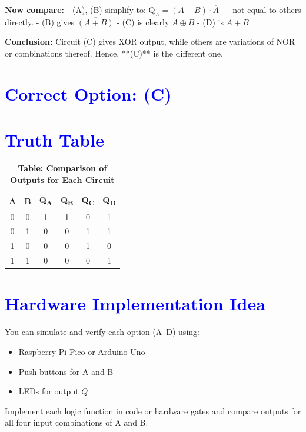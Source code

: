 \documentclass[twocolumn]{article}
\begin{document}
\textbf{Now compare:}  
- (A), (B) simplify to: $\text{Q}_A = \overline{(A + B)} \cdot \overline{A}$ — not equal to others directly.  
- (B) gives $\overline{(A + B)}$  
- (C) is clearly $A \oplus B$  
- (D) is $\overline{A} + B$

\textbf{Conclusion:} Circuit (C) gives XOR output, while others are variations of NOR or combinations thereof.  
Hence, **(C)** is the different one.

\section*{\textcolor{blue}{Correct Option: (C)}}

\section*{\textcolor{blue}{Truth Table}}

\begin{table}[h]
\centering
\renewcommand{\arraystretch}{1.3}
\begin{tabular}{|c|c|c|c|c|c|}
\hline
A & B & Q\textsubscript{A} & Q\textsubscript{B} & Q\textsubscript{C} & Q\textsubscript{D} \\
\hline
0 & 0 & 1 & 1 & 0 & 1 \\
0 & 1 & 0 & 0 & 1 & 1 \\
1 & 0 & 0 & 0 & 1 & 0 \\
1 & 1 & 0 & 0 & 0 & 1 \\
\hline
\end{tabular}
\caption*{\textbf{Table: Comparison of Outputs for Each Circuit}}
\end{table}

\section*{\textcolor{blue}{Hardware Implementation Idea}}

You can simulate and verify each option (A–D) using:
\begin{itemize}
    \item Raspberry Pi Pico or Arduino Uno
    \item Push buttons for A and B
    \item LEDs for output $Q$
\end{itemize}

Implement each logic function in code or hardware gates and compare outputs for all four input combinations of A and B.
\end{document}
